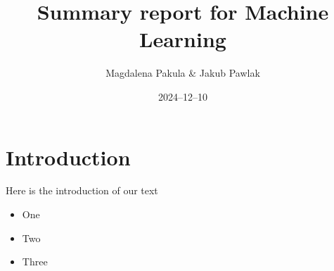 \documentclass[12pt]{article}
\title{Summary report for Machine Learning}
\author{Magdalena Pakula & Jakub Pawlak}
\date{2024–12–10}
\begin{document}
\maketitle

\section{Introduction}

Here is the introduction of our text

\begin{itemize}

\item One

\item Two

\item Three

\end{itemize}
\end{document}
